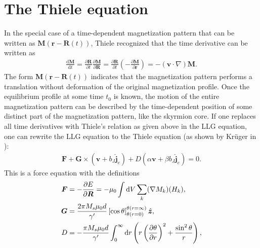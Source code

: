 \section{The Thiele equation}
In the special case of a time-dependent magnetization pattern that can be written as $\mathbold{M}(\mathbold{r}-\mathbold{R}(t))$, Thiele recognized \cite{Thiele1973} that the time derivative can be written as 
\begin{align}
\label{eq:ThieleRelation}
\frac{\textrm{d} \mathbold{M}}{\textrm{d} t} = \frac{\partial \mathbold{R}}{\partial t}\frac{\partial \mathbold{M}}{\partial \mathbold{R}} = \frac{\partial \mathbold{R}}{\partial t} (-\frac{\partial \mathbold{M}}{\partial \mathbold{r}}) = -(\mathbold{v}\cdot\nabla)\mathbold{M}.
\end{align}
The form $\mathbold{M}(\mathbold{r}-\mathbold{R}(t))$ indicates that the magnetization pattern performs a translation without deformation of the original magnetization profile. Once the equilibrium profile at some time $t_0$ is known, the motion of the entire magnetization pattern can be described by the time-dependent position of some distinct part of the magnetization pattern, like the skyrmion core. If one replaces all time derivatives with Thiele's relation as given above in the LLG equation, one can rewrite the LLG equation to the Thiele equation (as shown by Kr\"{u}ger in \cite{krugerDissertation}):
\begin{align}
\label{eq:Thiele}
\mathbold{F} + \mathbold{G}\times(\mathbold{v}+b_J\mathbold{\hat{j}}_e) + D(\alpha\mathbold{v}+\beta b_J\mathbold{\hat{j}}_e) = 0.
\end{align}
This is a force equation with the definitions
\begin{subequations}
\label{eq:ThieleFGD}
\begin{align}
\label{eq:ThieleF}
\mathbold{F} &= -\frac{\partial E}{\partial \mathbold{R}} = -\mu_0\int \d V\sum_k (\mathbold{\nabla}M_k)(H_k), \\
\label{eq:ThieleG}
\mathbold{G} &= \frac{2\pi M_s\mu_0 d}{\gamma'}\left[\cos\theta\right]_{\theta(r=0)}^{\theta(r=\infty)} \mathbold{\hat{z}},\\
\label{eq:ThieleD}
D &= - \frac{\pi M_s \mu_0 d}{\gamma '} \int_0^{\infty} \d r \left(r\left(\frac{\partial \theta}{\partial r}\right)^2+\frac{\sin^2\theta}{r}\right),
\end{align}
\end{subequations}
